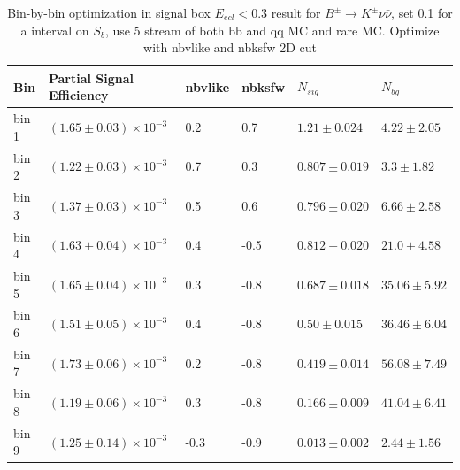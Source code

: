 \begin{table}[h]
\small
\begin{center}
\begin{tabular}{ |p{0.8cm}||p{3.7cm}||p{1.2cm}||p{1.2cm}||p{2.6cm}||p{2.7cm}| }
 \hline
 Bin & Partial Signal Efficiency & nbvlike & nbksfw & $N_{sig}$ & $N_{bg}$  \\
 \hline
 bin 1  & $(1.65 \pm 0.03) \times 10^{-3}$ &0.2&0.7&$1.21\pm 0.024 $  &$4.22\pm 2.05 $\\ %
 \hline
 bin 2  & $(1.22 \pm 0.03)\times 10^{-3}$ &0.7& 0.3&$0.807 \pm 0.019 $&$3.3\pm 1.82 $\\ %
 \hline
 bin 3  & $(1.37 \pm 0.03)\times 10^{-3}$ &0.5&0.6&$0.796 \pm 0.020 $&$6.66\pm 2.58 $\\ %
 \hline
 bin 4  & $(1.63 \pm 0.04)\times 10^{-3}$ &0.4&-0.5&$0.812 \pm 0.020 $&$21.0\pm 4.58 $ \\ %
 \hline
 bin 5  & $(1.65\pm 0.04) \times 10^{-3}$ &0.3& -0.8&$0.687 \pm 0.018 $&$35.06\pm 5.92 $ \\ %
 \hline
 bin 6  & $(1.51\pm 0.05) \times 10^{-3}$ &0.4& -0.8&$0.50\pm 0.015 $&$36.46 \pm 6.04 $\\ %
 \hline
 bin 7  & $(1.73 \pm 0.06)\times 10^{-3}$ &0.2&-0.8&$0.419 \pm 0.014 $&$ 56.08\pm 7.49 $ \\ %
 \hline
 bin 8  & $(1.19 \pm 0.06)\times 10^{-3}$ &0.3&-0.8&$0.166 \pm 0.009 $&$ 41.04\pm 6.41 $ \\ %
 \hline
 bin 9  & $(1.25 \pm 0.14)\times 10^{-3}$ &-0.3&-0.9&$0.013 \pm 0.002 $&$ 2.44\pm 1.56 $ \\ %
 \hline
 \hline
\end{tabular}

\caption{Bin-by-bin optimization in signal box $E_{ecl} < 0.3$ result for $B^\pm \rightarrow K^\pm \nu \bar{\nu}$, set 0.1 for a interval on $S_b$, use 5 stream of both bb and qq MC and rare MC. Optimize with nbvlike and nbksfw 2D cut } \label{t:optk}
\end{center}
\end{table}

